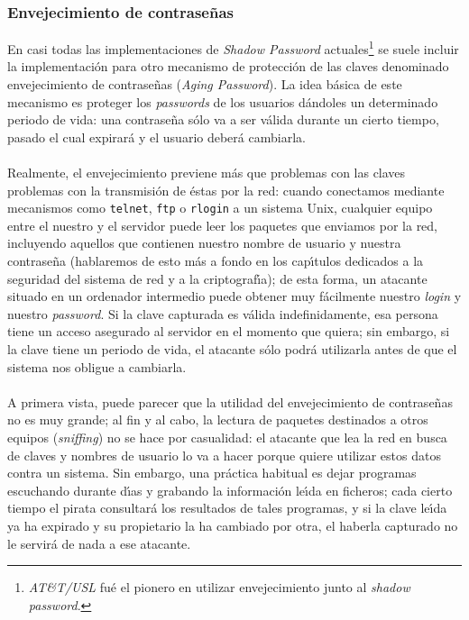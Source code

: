 \subsubsection{Envejecimiento de contrase\~nas}
En casi todas las implementaciones de {\it Shadow Password} 
actuales\footnote{{\it AT\&T/USL} fu\'e el pionero en utilizar envejecimiento
junto al {\it shadow password}.} se suele incluir la
implementaci\'on para otro mecanismo de protecci\'on de las claves denominado
envejecimiento de contrase\~nas ({\it Aging Password}). La idea b\'asica de
este mecanismo es proteger los {\it passwords} de los usuarios d\'andoles un 
determinado periodo de vida: una contrase\~na s\'olo va a ser v\'alida durante 
un cierto tiempo, pasado el cual expirar\'a y el usuario deber\'a cambiarla.\\
\\Realmente, el envejecimiento previene m\'as que problemas con las claves 
problemas con la transmisi\'on de \'estas por la red: cuando conectamos 
mediante mecanismos como {\tt telnet}, {\tt ftp} o {\tt rlogin} a un sistema 
Unix, cualquier equipo entre el nuestro y el servidor puede leer los paquetes
que enviamos por la red, incluyendo aquellos que contienen nuestro nombre de
usuario y nuestra contrase\~na (hablaremos de esto m\'as a fondo en los 
cap\'{\i}tulos dedicados a la seguridad del sistema de red y a la 
criptograf\'{\i}a); de esta forma, un atacante situado en un ordenador 
intermedio puede obtener muy f\'acilmente nuestro {\it login} y nuestro {\it 
password}. Si la clave capturada es v\'alida indefinidamente, esa persona tiene
un acceso asegurado al servidor en el momento que quiera; sin embargo, si la
clave tiene un periodo de vida, el atacante s\'olo podr\'a utilizarla antes de
que el sistema nos obligue a cambiarla.\\
\\A primera vista, puede parecer que la utilidad del envejecimiento de 
contrase\~nas no es muy grande; al fin y al cabo, la lectura de paquetes 
destinados a otros equipos ({\it sniffing}) no se hace por casualidad: el 
atacante que lea la red en busca de claves y nombres de usuario lo va a hacer
porque quiere utilizar estos datos contra un sistema. Sin embargo, una 
pr\'actica habitual es dejar programas escuchando durante d\'{\i}as y grabando 
la informaci\'on le\'{\i}da en ficheros; cada cierto tiempo el pirata 
consultar\'a los resultados de tales programas, y si la clave le\'{\i}da ya ha 
expirado y su propietario la ha cambiado por otra, el haberla capturado no le 
servir\'a de nada a ese atacante.\\
